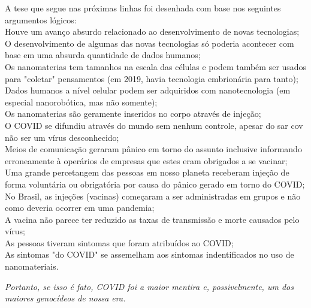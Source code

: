 \documentclass[11pt]{book}
\begin{document}
A tese que segue nas próximas linhas foi desenhada com base nos seguintes argumentos lógicos: \\

Houve um avanço absurdo relacionado ao desenvolvimento de novas tecnologias; \\

O desenvolvimento de algumas das novas tecnologias só poderia acontecer com base em uma absurda quantidade de dados humanos; \\

Os nanomaterias tem tamanhos na escala das células e podem também ser usados para "coletar" pensamentos (em 2019, havia tecnologia embrionária para tanto); \\

Dados humanos a nível celular podem ser adquiridos com nanotecnologia (em especial nanorobótica, mas não somente); \\

Os nanomaterias são geramente inseridos no corpo através de injeção; \\

O COVID se difundiu através do mundo sem nenhum controle, apesar do sar cov não ser um vírus desconhecido; \\

Meios de comunicação geraram pânico em torno do assunto inclusive informando erroneamente à operários de empresas que estes eram obrigados a se vacinar; \\

Uma grande percetangem das pessoas em nosso planeta receberam injeção de forma voluntária ou obrigatória por causa do pânico gerado em torno do COVID; \\

No Brasil, as injeções (vacinas) começaram a ser administradas em grupos e não como deveria ocorrer em uma pandemia; \\

A vacina não parece ter reduzido as taxas de transmissão e morte causados pelo vírus; \\

As pessoas tiveram sintomas que foram atribuídos ao COVID; \\

As sintomas "do COVID" se assemelham aos sintomas indentificados no uso de nanomateriais. \\

\noindent \begin{center} \emph{Portanto, se isso é fato, COVID foi a maior mentira e, possivelmente, um dos maiores genocídeos de nossa era.} \end{center}
\end{document}
